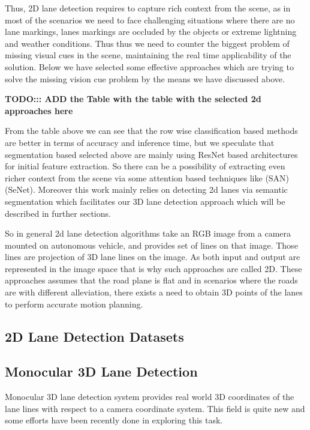 Thus, 2D lane detection requires to capture rich context from the scene, as in most of the scenarios we need to face challenging situations where there are no lane markings, lanes markings are occluded by the objects or extreme lightning and weather conditions. Thus thus we need to counter the biggest problem of missing visual cues in the scene, maintaining the real time applicability of the solution. Below we have selected some effective approaches which are trying to solve the missing vision cue problem by the means we have discussed above.   

\textbf{TODO::: ADD the Table with the table with the selected 2d approaches here}

From the table above we can see that the row wise classification based methods are better in terms of accuracy and inference time, but we speculate that segmentation based selected above are mainly using ResNet\cite{} based architectures for initial feature extraction. So there can be a possibility of extracting even richer context from the scene via some attention based techniques like \cite{} (SAN) \cite{} (SeNet). Moreover this work mainly relies on detecting 2d lanes via semantic segmentation which facilitates our 3D lane detection approach which will be described in further sections. 

So in general 2d lane detection algorithms take an RGB image from a camera mounted on autonomous vehicle, and provides set of lines on that image. Those lines are projection of 3D lane lines on the image. As both input and output are represented in the image space that is why such approaches are called 2D. These approaches assumes that the road plane is flat and in scenarios where the roads are with different alleviation, there exists a need to obtain 3D points of the lanes to perform accurate motion planning.
        
        \subsection{2D Lane Detection Datasets}
        
        \subsection{Monocular 3D Lane Detection}
        Monocular 3D lane detection system provides real world 3D coordinates of the lane lines with respect to a camera coordinate system. This field is quite new and some efforts have been recently done in exploring this task. 
 
